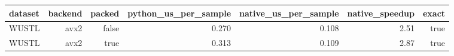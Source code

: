 \begin{tabular}{lrrrrrr}
\toprule
dataset & backend & packed & python\_us\_per\_sample & native\_us\_per\_sample & native\_speedup & exact \\
\midrule
WUSTL & avx2 & false & 0.270 & 0.108 & 2.51 & true \\
WUSTL & avx2 & true & 0.313 & 0.109 & 2.87 & true \\
\bottomrule
\end{tabular}

